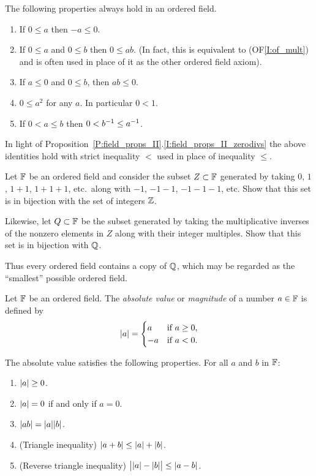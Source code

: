 \documentclass{book}
\begin{document}
\begin{prop}
The following properties always hold in an ordered field.
\begin{enumerate}
\item If $0 \leq a$ then $-a \leq 0$. 
\item 
If $0 \leq a $ and $0 \leq b$ then $0 \leq ab$. (In fact, this is equivalent to (OF\ref{I:of_mult}) and is often used
in place of it as the other ordered field axiom).
\item
If $a \leq 0$ and $0 \leq b$, then $ab \leq 0$. 
\item
$0 \leq a^2$ for any $a$. In particular $0 < 1$. 
\item 
If $0 < a \leq b$ then $0 < b^{-1} \leq a^{-1}$. 
\end{enumerate}
In light of Proposition~\ref{P:field_props_II}.\eqref{I:field_props_II_zerodivs} the above identities hold with strict
inequality $<$ used in place of inequality $\leq$. 
\label{P:of_props}
\end{prop}

\begin{prob}
Let $\mathbb{F}$ be an ordered field and consider the subset $Z \subset \mathbb{F}$ generated by taking $0$, $1$, $1 + 1$, $1 + 1 + 1$, etc.\ along with $-1$, $-1 - 1$, $-1 -1 -1$, etc. Show that
this set is in bijection with the set of integers $\mathbb{Z}$. 

Likewise, let $Q \subset \mathbb{F}$ be the subset generated by taking the multiplicative inverses of the nonzero elements in $Z$ along with their integer multiples. Show that this set is in bijection
with $\mathbb{Q}$. 

Thus every ordered field contains a copy of $\mathbb{Q}$, which may be regarded as the ``smallest'' possible ordered field.
\label{Pr:Q_subfield}
\end{prob}

\begin{defn}
Let $\mathbb{F}$ be an ordered field. The {\em absolute value} or {\em magnitude} of a number $a \in \mathbb{F}$ is defined by
\[
	\lvert a\rvert = \begin{cases} a & \text{if $a \geq 0$}, \\ -a & \text{if $a < 0$.} \end{cases}
\]
\label{D:abs_value}
\end{defn}

\begin{propstar}
The absolute value satisfies the following properties. For all $a$ and $b$ in $\mathbb{F}$:
\begin{enumerate}
\item $\lvert a\rvert \geq 0$.
\item $\lvert a\rvert = 0$ if and only if $a = 0$.
\item $\lvert ab\rvert = \lvert a\rvert \lvert b\rvert$.  
\item (Triangle inequality) $\lvert a + b\rvert \leq \lvert a\rvert + \lvert b\rvert$.
\label{I:abs_triang}
\item (Reverse triangle inequality) $\big\lvert\lvert a\rvert - \lvert b\rvert\big\rvert \leq \lvert a - b\rvert$.
\label{I:abs_rev_triang}
\end{enumerate}
\label{P:abs_props}
\end{propstar}
\end{document}
